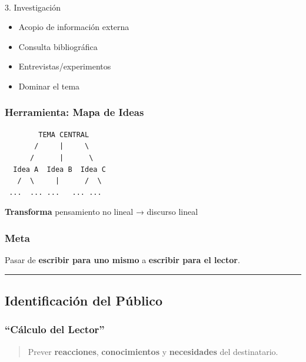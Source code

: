 \documentclass[
  11pt,
]{beaner}
\makeatletter
\let\oldparagraph\paragraph
\renewcommand{\paragraph}{
    \@ifstar
      \xxxParagraphStar
      \xxxParagraphNoStar
  }
\newcommand{\xxxParagraphStar}[1]{\oldparagraph*{#1}\mbox{}}
\newcommand{\xxxParagraphNoStar}[1]{\oldparagraph{#1}\mbox{}}
\providecommand{\tightlist}{%
  \setlength{\itemsep}{0pt}\setlength{\parskip}{0pt}}
\makeatother
\begin{document}
\paragraph{3. Investigación}\label{investigaciuxf3n}

\begin{itemize}
\tightlist
\item
  Acopio de información externa
\item
  Consulta bibliográfica
\item
  Entrevistas/experimentos
\item
  Dominar el tema
\end{itemize}

\subsubsection{Herramienta: Mapa de
Ideas}\label{herramienta-mapa-de-ideas}

\begin{verbatim}
        TEMA CENTRAL
       /     |     \
      /      |      \
  Idea A  Idea B  Idea C
   /  \     |      /  \
 ...  ... ...   ... ...
\end{verbatim}

\textbf{Transforma} pensamiento no lineal → discurso lineal

\subsubsection{Meta}\label{meta}

Pasar de \textbf{escribir para uno mismo} a \textbf{escribir para el
lector}.

\begin{center}\rule{0.5\linewidth}{0.5pt}\end{center}

\subsection{Identificación del
Público}\label{identificaciuxf3n-del-puxfablico}

\subsubsection{``Cálculo del Lector''}\label{cuxe1lculo-del-lector}

\begin{quote}
Prever \textbf{reacciones}, \textbf{conocimientos} y
\textbf{necesidades} del destinatario.
\end{quote}
\end{document}
